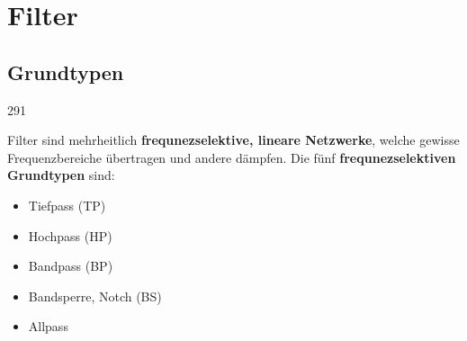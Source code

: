 \section{Filter}


\subsection{Grundtypen}{291}

Filter sind mehrheitlich \textbf{frequnezselektive, lineare Netzwerke}, welche gewisse Frequenzbereiche übertragen
und andere dämpfen. Die fünf \textbf{frequnezselektiven Grundtypen} sind: 

\begin{minipage}[t]{0.25\columnwidth}
    \begin{itemize}
        \item Tiefpass (TP)
        \item Hochpass (HP)
    \end{itemize}
\end{minipage}
\hfill
\begin{minipage}[t]{0.35\columnwidth}
    \begin{itemize}
        \item Bandpass (BP)
        \item Bandsperre, Notch (BS)
    \end{itemize}
\end{minipage}
\hfill
\begin{minipage}[t]{0.25\columnwidth}
    \begin{itemize}
        \item Allpass
    \end{itemize}
\end{minipage}




